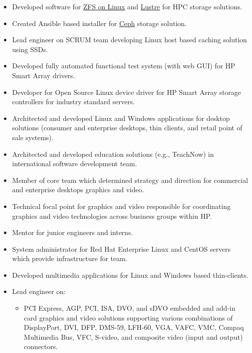 \documentclass[10pt,letterpaper,oneside]{report}
\begin{document}
\begin{itemize}
  \item Developed software for {\href{https://zfsonlinux.org/}{ZFS on Linux}}
    and {\href{http://lustre.org/}{Lustre}} for HPC storage solutions.

  \item Created Ansible based installer for \href{https://ceph.com}{Ceph}
    storage solution.

  \item Lead engineer on SCRUM team developing Linux host based caching
    solution using SSDs.

  \item Developed fully automated functional test system (with web GUI) for HP
    Smart Array drivers.

  \item Developer for Open Source Linux device driver for HP Smart Array
    storage controllers for industry standard servers.

  \item Architected and developed Linux and Windows applications for desktop
    solutions (consumer and enterprise desktops, thin clients, and retail
    point of sale systems).

  \item Architected and developed education solutions (e.g., TeachNow) in
    international software development team.

  \item Member of core team which determined strategy and direction for
    commercial and enterprise desktops graphics and video.

  \item Technical focal point for graphics and
    video responsible for coordinating graphics and video technologies across
    business groups within HP.

  \item Mentor for junior engineers and interns.

  \item System administrator for Red Hat Enterprise Linux and CentOS servers
    which provide infrastructure for team.

  \item Developed multimedia applications for Linux and Windows based
    thin-clients.

  \item Lead engineer on:
    \begin {itemize}
      \item PCI Express, AGP, PCI, ISA, DVO, and sDVO embedded and add-in card
        graphics and video solutions supporting various combinations of
        DisplayPort, DVI, DFP, DMS-59, LFH-60, VGA, VAFC, VMC, Compaq Multimedia
        Bus, VFC, S-video, and composite video (input and output) connectors.


\end{itemize}
\end{itemize}
\end{document}
